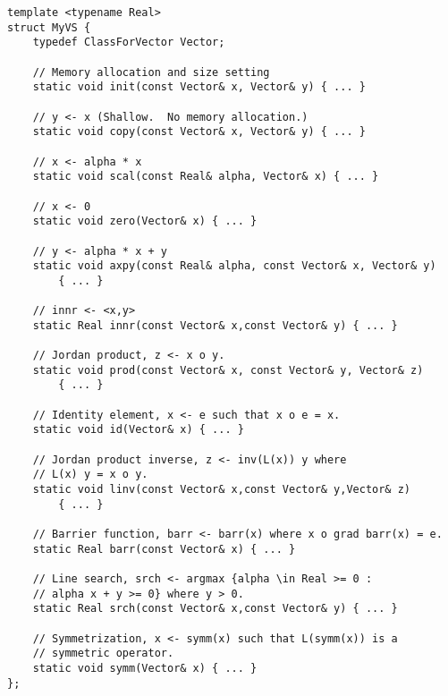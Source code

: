 \begin{lstlisting}[style=C++]
template <typename Real>
struct MyVS {
    typedef ClassForVector Vector;

    // Memory allocation and size setting
    static void init(const Vector& x, Vector& y) { ... }

    // y <- x (Shallow.  No memory allocation.)
    static void copy(const Vector& x, Vector& y) { ... }

    // x <- alpha * x
    static void scal(const Real& alpha, Vector& x) { ... }

    // x <- 0 
    static void zero(Vector& x) { ... }

    // y <- alpha * x + y
    static void axpy(const Real& alpha, const Vector& x, Vector& y)
        { ... }

    // innr <- <x,y>
    static Real innr(const Vector& x,const Vector& y) { ... }

    // Jordan product, z <- x o y.
    static void prod(const Vector& x, const Vector& y, Vector& z)
        { ... }

    // Identity element, x <- e such that x o e = x.
    static void id(Vector& x) { ... }

    // Jordan product inverse, z <- inv(L(x)) y where
    // L(x) y = x o y.
    static void linv(const Vector& x,const Vector& y,Vector& z)
        { ... }

    // Barrier function, barr <- barr(x) where x o grad barr(x) = e.
    static Real barr(const Vector& x) { ... }

    // Line search, srch <- argmax {alpha \in Real >= 0 : 
    // alpha x + y >= 0} where y > 0. 
    static Real srch(const Vector& x,const Vector& y) { ... }

    // Symmetrization, x <- symm(x) such that L(symm(x)) is a
    // symmetric operator.
    static void symm(Vector& x) { ... }
};
\end{lstlisting}
